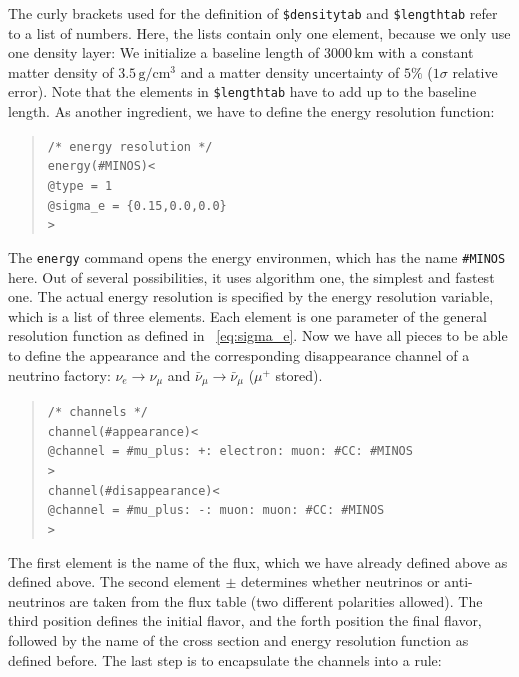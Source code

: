 The curly brackets used for the definition of {\tt \$densitytab} and
{\tt \$lengthtab} refer to a list of numbers. Here, the lists contain only
one element, because we only use one density layer: We initialize a baseline length of $3000 \, \mathrm{km}$ with a constant matter density of $3.5 \, \mathrm{g/cm^3}$ and a matter density uncertainty of $5\%$ ($1 \sigma$ relative error). Note that the elements in {\tt \$lengthtab} have to add up to the baseline length. 
%
As another ingredient, we have to define the energy resolution function:
\begin{quote}
{\tt /* energy resolution */}\\
{\tt energy(\#MINOS)<}\\
{\tt \tb @type = 1}\\
{\tt \tb @sigma\_e = \{0.15,0.0,0.0\}}\\
{\tt >}
\end{quote}
The {\tt energy} command opens the energy environmen, which has the name 
{\tt \#MINOS} here. Out of several possibilities, it uses algorithm one,
the simplest and fastest one. The actual energy resolution is specified
by the energy resolution variable, which is a list of three elements. Each 
element is one parameter of the general resolution function as defined in 
\eq~\ref{eq:sigma_e}.
%
Now we have all pieces to be able to define the appearance and the corresponding disappearance channel of a neutrino factory: 
$\nu_e\rightarrow\nu_\mu$  and $\bar\nu_\mu\rightarrow\bar\nu_\mu$ 
($\mu^+$ stored).
\begin{quote}
{\tt /* channels */}\\
{\tt channel(\#appearance)<}\\
{\tt \tb @channel = \#mu\_plus: +: electron: muon: \#CC: \#MINOS}\\
{\tt >}\\
{\tt channel(\#disappearance)<}\\
{\tt \tb @channel = \#mu\_plus: -: muon: muon: \#CC: \#MINOS}\\
{\tt >}
\end{quote}
The first element is the name of the flux, which we have already defined above as defined above. The second element $\pm$ determines whether 
neutrinos or anti-neutrinos are taken from the flux table (two different polarities allowed). The third position defines the initial flavor,
and the forth position the final flavor, followed by the name of the cross
section and energy resolution function as defined before.
%
The last step is to encapsulate the channels into a rule:
